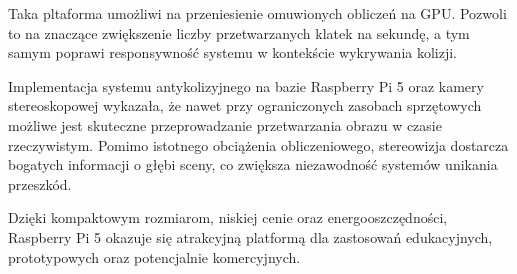 \documentclass[magisterska]{pracadypl}
\begin{document}
Taka pltaforma umożliwi na przeniesienie omuwionych obliczeń na GPU. Pozwoli to na znaczące zwiększenie liczby przetwarzanych klatek na sekundę, a tym samym poprawi responsywność systemu w kontekście wykrywania kolizji.

Implementacja systemu antykolizyjnego na bazie Raspberry Pi 5 oraz kamery stereoskopowej wykazała, że nawet przy ograniczonych zasobach sprzętowych możliwe jest skuteczne przeprowadzanie przetwarzania obrazu w czasie rzeczywistym. Pomimo istotnego obciążenia obliczeniowego, stereowizja dostarcza bogatych informacji o głębi sceny, co zwiększa niezawodność systemów unikania przeszkód.

Dzięki kompaktowym rozmiarom, niskiej cenie oraz energooszczędności, Raspberry Pi 5 okazuje się atrakcyjną platformą dla zastosowań edukacyjnych, prototypowych oraz potencjalnie komercyjnych.

\renewcommand{\listfigurename}{Spis rysunków}
\listoffigures
\end{document}
